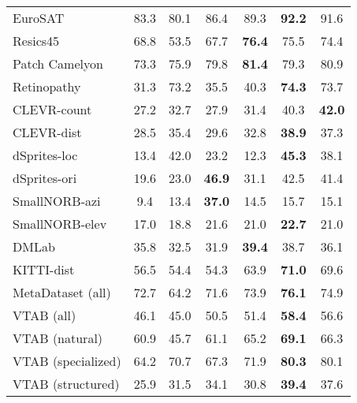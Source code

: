 \documentclass{article}
\begin{document}
\begin{table}[H]
\begin{center}
\begin{small}
\begin{tabular}{lcccccc}
\midrule
EuroSAT & 83.3 & 80.1 & 86.4 & 89.3 & \textbf{92.2} & 91.6\\
Resics45 & 68.8 & 53.5 & 67.7 & \textbf{76.4} & 75.5 & 74.4\\
Patch Camelyon & 73.3 & 75.9 & 79.8 & \textbf{81.4} & 79.3 & 80.9\\
Retinopathy & 31.3 & 73.2 & 35.5 & 40.3 & \textbf{74.3} & 73.7\\
\midrule
CLEVR-count & 27.2 & 32.7 & 27.9 & 31.4 & 40.3 & \textbf{42.0}\\
CLEVR-dist & 28.5 & 35.4 & 29.6 & 32.8 & \textbf{38.9} & 37.3\\
dSprites-loc & 13.4 & 42.0 & 23.2 & 12.3 & \textbf{45.3} & 38.1\\
dSprites-ori & 19.6 & 23.0 & \textbf{46.9} & 31.1 & 42.5 & 41.4\\
SmallNORB-azi & 9.4 & 13.4 & \textbf{37.0} & 14.5 & 15.7 & 15.1\\
SmallNORB-elev & 17.0 & 18.8 & 21.6 & 21.0 & \textbf{22.7} & 21.0\\
DMLab & 35.8 & 32.5 & 31.9 & \textbf{39.4} & 38.7 & 36.1\\
KITTI-dist & 56.5 & 54.4 & 54.3 & 63.9 & \textbf{71.0} & 69.6\\
\midrule
MetaDataset (all) & 72.7 & 64.2 & 71.6 & 73.9 & \textbf{76.1} & 74.9\\
VTAB (all) & 46.1 & 45.0 & 50.5 & 51.4 & \textbf{58.4} & 56.6\\
VTAB (natural) & 60.9 & 45.7 & 61.1 & 65.2 & \textbf{69.1} & 66.3\\
VTAB (specialized) & 64.2 & 70.7 & 67.3 & 71.9 & \textbf{80.3} & 80.1\\
VTAB (structured) & 25.9 & 31.5 & 34.1 & 30.8 & \textbf{39.4} & 37.6\\
\bottomrule
\end{tabular}
\label{tab:breakdown_uppercase_vs_metalearning}
\end{small}
\end{center}
\vskip -0.1in
\end{table}
\end{document}
